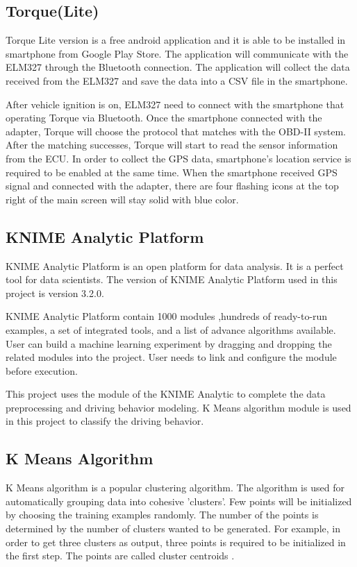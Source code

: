 \subsection{Torque(Lite)}
Torque Lite version is a free android application and it is able to be installed in smartphone from Google Play Store. The application will communicate with the ELM327 through the Bluetooth connection. The application will collect the data received from the ELM327 and  save the data into a CSV file in the smartphone. 

After vehicle ignition is on, ELM327 need to connect with the smartphone that operating Torque via Bluetooth. Once the smartphone connected with the adapter, Torque will choose the protocol that matches with the OBD-II system. After the matching successes, Torque will start to read the sensor information from the ECU. In order to collect the GPS data, smartphone's location service is required to be enabled at the same time. When the smartphone received GPS signal and connected with the adapter, there are four flashing icons at the top right of the main screen will stay solid with blue color.

\subsection{KNIME Analytic Platform}
KNIME Analytic Platform is an open platform for data analysis. It is a perfect tool for data scientists. The version of KNIME Analytic Platform used in this project is version 3.2.0. 

KNIME Analytic Platform contain 1000 modules ,hundreds of ready-to-run examples, a set of integrated tools, and a list of advance algorithms available. User can build a machine learning experiment by dragging and dropping the related modules into the project. User needs to link and configure the module before execution.

This project uses the module of the KNIME Analytic to complete the data preprocessing and driving behavior modeling. K Means algorithm module is used in this project to classify the driving behavior.

\subsection{K Means Algorithm}
K Means algorithm is a popular clustering algorithm. The algorithm is used for automatically grouping data into cohesive 'clusters'. Few points will be initialized by choosing the training examples randomly. The number of the points is determined by the number of clusters wanted to be generated. For example, in order to get three clusters as output, three points is required to be initialized in the first step. The points are called cluster centroids \cite{andrew:2016}.

